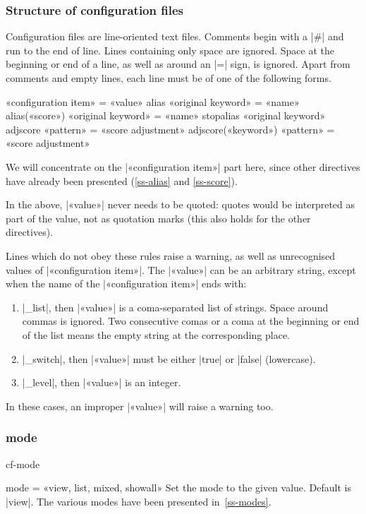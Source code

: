 \documentclass[a4paper, oneside]{scrartcl}
\makeatletter
\newif\ifframed
\newenvironment{cmdsubsub}[2]{%
  \framedfalse \commandes\subsubsection{#1}{#2}%
  }{%
  \endcommandes}
\newenvironment{htcode}{%
  \SaveVerbatim[samepage, gobble=2]{verbmat}%
  }{%
  \endSaveVerbatim
  \par\medskip\noindent\hspace*{\parindent}%
  \BUseVerbatim{verbmat}%
  \par\medskip\@endpetrue}
\makeatother
\begin{document}
\subsubsection{Structure of configuration files}\label{sss-sonf-struct}

Configuration files are line-oriented text files. Comments begin with a |#|
and run to the end of line. Lines containing only space are ignored. Space at
the beginning or end of a line, as well as around an |=| sign, is ignored.
Apart from comments and empty lines, each line must be of one of the following
forms.

\begin{htcode}
  «configuration item» = «value»
  alias «original keyword» = «name»
  alias(«score») «original keyword» = «name»
  stopalias «original keyword»
  adjscore «pattern» = «score adjustment»
  adjscore(«keyword») «pattern» = «score adjustment»
\end{htcode}

We will concentrate on the |«configuration item»| part here, since other
directives have already been presented (\ref{ss-alias} and \ref{ss-score}).

In the above, |«value»|  never needs to be quoted: quotes would be interpreted
as part of the value, not as quotation marks (this also holds for the other
directives).

Lines which do not obey these rules raise a warning, as well as unrecognised
values of |«configuration item»|. The |«value»| can be an arbitrary string,
except when the name of the |«configuration item»| ends with:
\begin{enumerate}
  \item |_list|, then |«value»| is a coma-separated list of strings. Space
    around commas is ignored. Two consecutive comas or a coma at the beginning
    or end of the list means the empty string at the corresponding place.
  \item |_switch|, then |«value»| must be either |true| or |false|
    (lowercase).
  \item |_level|, then |«value»| is an integer.
\end{enumerate}
In these cases, an improper |«value»| will raise a warning too.

\begin{cmdsubsub}{mode}{cf-mode}
  mode = «view, list, mixed, showall»
\end{cmdsubsub}
Set the  mode to the given value.  Default is |view|. The various modes
have been presented in~\ref{ss-modes}.
\end{document}
